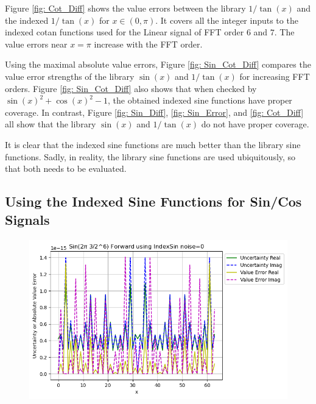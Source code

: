 \documentclass[twoside]{article}
\numberwithin{equation}{section}
\begin{document}
Figure \ref{fig: Cot_Diff} shows the value errors between the library $1/\tan(x)$ and the indexed $1/\tan(x)$ for $x \in (0, \pi)$.
It covers all the integer inputs to the indexed cotan functions used for the Linear signal of FFT order $6$ and $7$.
The value errors near $x = \pi$ increase with the FFT order.

Using the maximal absolute value errors, Figure \ref{fig: Sin_Cot_Diff} compares the value error strengths of the library $\sin(x)$ and $1/\tan(x)$ for increasing FFT orders.
Figure \ref{fig: Sin_Cot_Diff} also shows that when checked by $\sin(x)^2 + \cos(x)^2 - 1$, the obtained indexed sine functions have proper coverage.
In contrast, Figure \ref{fig: Sin_Diff}, \ref{fig: Sin_Error}, and \ref{fig: Cot_Diff} all show that the library $\sin(x)$ and $1/\tan(x)$ do not have proper coverage.

It is clear that the indexed sine functions are much better than the library sine functions.
Sadly, in reality, the library sine functions are used ubiquitously, so that both needs to be evaluated.

\subsection{Using the Indexed Sine Functions for Sin/Cos Signals}

\begin{figure}[p]
\includegraphics[height=2.75in]{FFT_Sin_Clean_6_3_Spec_Indexed.png} 
\label{fig: FFT_Sin_Clean_6_3_Spec_Indexed}
\end{figure}
\end{document}
